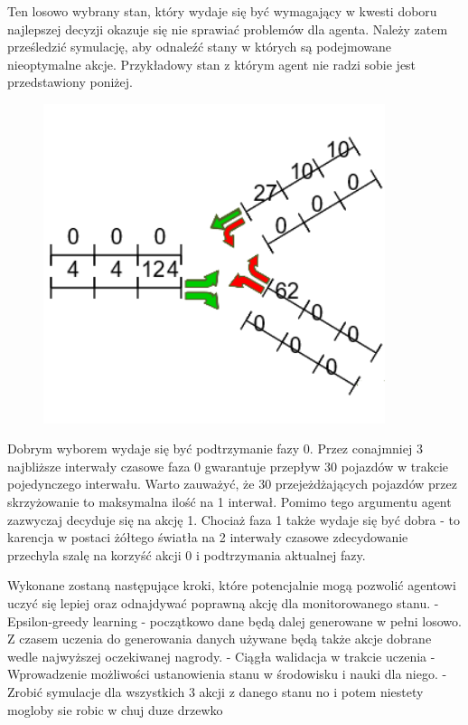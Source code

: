 \documentclass[12pt]{book}
\theoremstyle{plain}
\begin{document}
Ten losowo wybrany stan, który wydaje się być wymagający w kwesti doboru najlepszej decyzji okazuje się nie sprawiać problemów dla agenta. Należy zatem prześledzić symulację, aby odnaleźć stany w których są podejmowane nieoptymalne akcje. Przykładowy stan z którym agent nie radzi sobie jest przedstawiony poniżej. 

\begin{figure}[H]
	\centering
	\includegraphics[width=10cm]{env4_3_monitorowany_stan.png}
	\label{fig:	env4_3_monitorowany_stan.png}
\end{figure}

Dobrym wyborem wydaje się być podtrzymanie fazy 0. Przez conajmniej 3 najbliższe interwały czasowe faza 0 gwarantuje przepływ 30 pojazdów w trakcie pojedynczego interwału. Warto zauważyć, że 30 przejeżdżających pojazdów przez skrzyżowanie to maksymalna ilość na 1 interwał. Pomimo tego argumentu agent zazwyczaj decyduje się na akcję 1. Chociaż faza 1 także wydaje się być dobra - to karencja w postaci żółtego światła na 2 interwały czasowe zdecydowanie przechyla szalę na korzyść akcji 0 i podtrzymania aktualnej fazy.



Wykonane zostaną następujące kroki, które potencjalnie mogą pozwolić agentowi uczyć się lepiej oraz odnajdywać poprawną akcję dla monitorowanego stanu.
- Epsilon-greedy learning - początkowo dane będą dalej generowane w pełni losowo. Z czasem uczenia do generowania danych używane będą także akcje dobrane wedle najwyższej oczekiwanej nagrody.
- Ciągła walidacja w trakcie uczenia
- Wprowadzenie możliwości ustanowienia stanu w środowisku i nauki dla niego.
- Zrobić symulacje dla wszystkich 3 akcji z danego stanu no i potem niestety mogloby sie robic w chuj duze drzewko
\end{document}
